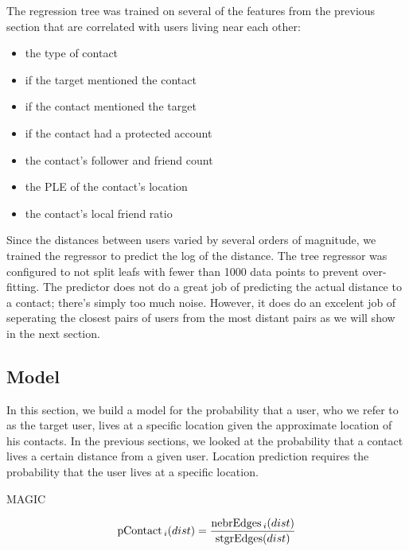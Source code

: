 The regression tree was trained on several of the features from the previous
section that are correlated with users living near each other:
\begin{itemize}
\item the type of contact
\item if the target mentioned the contact
\item if the contact mentioned the target
\item if the contact had a protected account
\item the contact's follower and friend count
\item the PLE of the contact's location
\item the contact's local friend ratio
\end{itemize}
%
Since the distances between users varied by several orders of magnitude, we
trained the regressor to predict the log of the distance.
%
The tree regressor was configured to not split leafs with fewer than 1000 data
points to prevent over-fitting.
%
The predictor does not do a great job of predicting the actual distance to a
contact; there's simply too much noise.
%
However, it does do an excelent job of seperating the closest pairs of users
from the most distant pairs as we will show in the next section.


\subsection{Model}
\label{sec:model}

In this section, we build a model for the probability that a user, who we refer
to as the target user, lives at a specific location given the approximate
location of his contacts.
%
In the previous sections, we looked at the probability that a contact lives a
certain distance from a given user.
%
Location prediction requires the probability that the user lives at a specific
location.

MAGIC

\[
\operatorname{pContact}{_i}(dist) = \frac{\operatorname{nebrEdges}{_i}(dist)}{\operatorname{stgrEdges}(dist)}
\]


